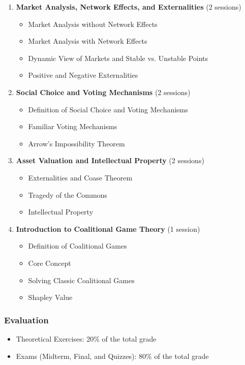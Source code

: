 \documentclass[12pt]{article}
\begin{document}
\begin{enumerate}
    \item \textbf{Market Analysis, Network Effects, and Externalities} (2 sessions)
    \begin{itemize}
        \item Market Analysis without Network Effects
        \item Market Analysis with Network Effects
        \item Dynamic View of Markets and Stable vs. Unstable Points
        \item Positive and Negative Externalities
    \end{itemize}
    \item \textbf{Social Choice and Voting Mechanisms} (2 sessions)
    \begin{itemize}
        \item Definition of Social Choice and Voting Mechanisms
        \item Familiar Voting Mechanisms
        \item Arrow’s Impossibility Theorem
    \end{itemize}
    \item \textbf{Asset Valuation and Intellectual Property} (2 sessions)
    \begin{itemize}
        \item Externalities and Coase Theorem
        \item Tragedy of the Commons
        \item Intellectual Property
    \end{itemize}
    \item \textbf{Introduction to Coalitional Game Theory} (1 session)
    \begin{itemize}
        \item Definition of Coalitional Games
        \item Core Concept
        \item Solving Classic Coalitional Games
        \item Shapley Value
    \end{itemize}
\end{enumerate}

\subsubsection*{Evaluation}
\begin{itemize}
    \item Theoretical Exercises: 20\% of the total grade
    \item Exams (Midterm, Final, and Quizzes): 80\% of the total grade
\end{itemize}
\end{document}
